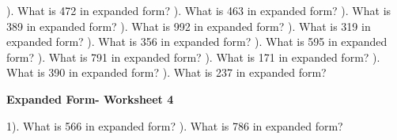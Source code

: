 \documentclass{article}%
\begin{document}
). What is 472 in expanded form?%
\newline%
\newline%
). What is 463 in expanded form?%
\newline%
\newline%
). What is 389 in expanded form?%
\newline%
\newline%
). What is 992 in expanded form?%
\newline%
\newline%
). What is 319 in expanded form?%
\newline%
\newline%
). What is 356 in expanded form?%
\newline%
\newline%
). What is 595 in expanded form?%
\newline%
\newline%
). What is 791 in expanded form?%
\newline%
\newline%
). What is 171 in expanded form?%
\newline%
\newline%
). What is 390 in expanded form?%
\newline%
\newline%
). What is 237 in expanded form?%
\newline%
\newline%
\newline%
\pagebreak%
\large%
\begin{center}%
\textbf{Expanded Form- Worksheet 4}%
\newline%
\end{center} \normalsize%
1). What is 566 in expanded form?%
\newline%
\newline%
). What is 786 in expanded form?%
\newline%
\newline%
\end{document}
